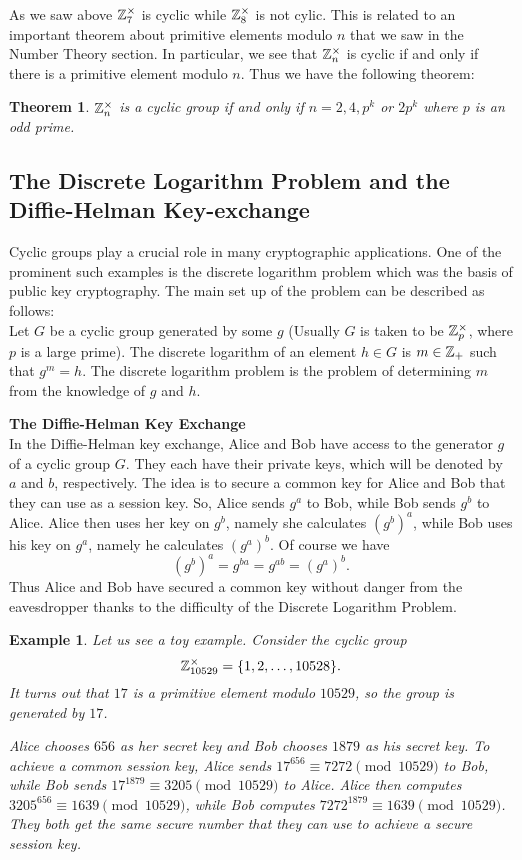 \documentclass[12pt]{article}
\theoremstyle{plain}
\newtheorem{example}{Example}
\newtheorem{theorem}{Theorem}
\theoremstyle{definition}
\theoremstyle{remark}
\begin{document}
As we saw above $\mathbb{Z}_{7}^{\times}$ is cyclic while $\mathbb{Z}_8^{\times}$ is not cylic. This is related to an important theorem about primitive elements modulo $n$ that we saw in the Number Theory section. In particular, we see that $\mathbb{Z}_n^{\times}$ is cyclic if and only if there is a primitive element modulo $n$. Thus we have the following theorem:
\begin{theorem}
$\mathbb{Z}_n^{\times}$ is a cyclic group if and only if $n=2, 4, p^k$ or $2p^k$ where $p$ is an odd prime.  
\end{theorem}

\subsection{The Discrete Logarithm Problem and the Diffie-Helman Key-exchange}
Cyclic groups play a crucial role in many cryptographic applications. One of the prominent such examples is the discrete logarithm problem which was the basis of public key cryptography. The main set up of the problem can be described as follows:
\\
Let $G$ be a cyclic group generated by some $g$ (Usually $G$ is taken to be $\mathbb{Z}_p^{\times}$, where $p$ is a large prime). 
The discrete logarithm of an element $h\in G$ is $m\in \mathbb{Z}_+$ such that $g^m=h$. The discrete logarithm problem is the problem of determining $m$ from the knowledge of $g$ and $h$. 

\bigskip
\noindent
{\bf The Diffie-Helman Key Exchange}\\
In the Diffie-Helman key exchange, Alice and Bob have access to the generator $g$ of a cyclic group $G$. They each have their private keys, which will be denoted by $a$ and $b$, respectively. The idea is to secure a common key for Alice and Bob that they can use as a session key. So, Alice sends $g^a$ to Bob, while Bob sends $g^b$ to Alice. Alice then uses her key on $g^b$, namely she calculates 
$(g^b)^a$, while Bob uses his key on $g^a$, namely he calculates $(g^a)^b$. Of course we have 
$$(g^b)^a=g^{ba} = g^{ab}=(g^a)^b.$$
Thus Alice and Bob have secured a common key without danger from the eavesdropper thanks to the difficulty of the Discrete Logarithm Problem.  

\begin{example}
Let us see a toy example. Consider the cyclic group 
$$\mathbb{Z}_{10529}^{\times} = \{1, 2, \dots, 10528\}. $$
It turns out that $17$ is a primitive element modulo $10529$, so the group is generated by $17$.

Alice chooses $656$ as her secret key and Bob chooses $1879$ as his secret key. To achieve a common session key, Alice sends $17^{656} \equiv 7272 \pmod{10529}$ to Bob, while Bob sends $17^{1879} \equiv 3205 \pmod {10529}$ to Alice. Alice then computes $3205^{656} \equiv 1639 \pmod{10529}$, while Bob computes $7272^{1879} \equiv 1639 \pmod{10529}$. They both get the same secure number that they can use to achieve a secure session key. 
\end{example}
\end{document}
